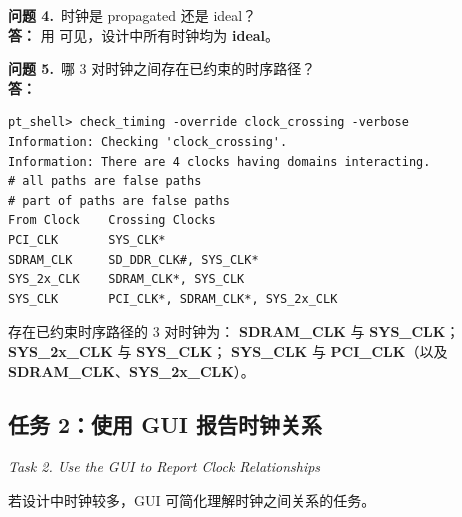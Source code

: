 \begin{enumerate}
\begin{questionBox}
\textbf{问题 4.}\ 时钟是 propagated 还是 ideal？\\[0.35em]
\textbf{答：} 用  可见，设计中所有时钟均为 \textbf{ideal}。

\textbf{问题 5.}\ 哪 3 对时钟之间存在已约束的时序路径？\\[0.35em]
\textbf{答：}\\
\begin{lstlisting}
pt_shell> check_timing -override clock_crossing -verbose
Information: Checking 'clock_crossing'.
Information: There are 4 clocks having domains interacting.
# all paths are false paths
# part of paths are false paths
From Clock    Crossing Clocks
PCI_CLK       SYS_CLK*
SDRAM_CLK     SD_DDR_CLK#, SYS_CLK*
SYS_2x_CLK    SDRAM_CLK*, SYS_CLK
SYS_CLK       PCI_CLK*, SDRAM_CLK*, SYS_2x_CLK
\end{lstlisting}
存在已约束时序路径的 3 对时钟为：
\textbf{SDRAM\_CLK} 与 \textbf{SYS\_CLK}；
\textbf{SYS\_2x\_CLK} 与 \textbf{SYS\_CLK}；
\textbf{SYS\_CLK} 与 \textbf{PCI\_CLK}（以及 \textbf{SDRAM\_CLK}、\textbf{SYS\_2x\_CLK}）。
\end{questionBox}
\end{enumerate}

\subsection{任务 2：使用 GUI 报告时钟关系}
\label{lab4:task2}

\noindent\textit{Task 2. Use the GUI to Report Clock Relationships}

若设计中时钟较多，GUI 可简化理解时钟之间关系的任务。

